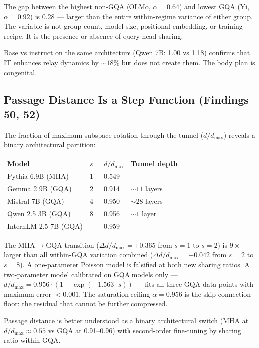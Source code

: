 \documentclass[12pt]{article}
\begin{document}
The gap between the highest non-GQA (OLMo, $\alpha = 0.64$) and lowest GQA (Yi, $\alpha = 0.92$) is 0.28 --- larger than the entire within-regime variance of either group. The variable is not group count, model size, positional embedding, or training recipe. It is the presence or absence of query-head sharing.

Base vs instruct on the same architecture (Qwen 7B: 1.00 vs 1.18) confirms that IT enhances relay dynamics by ${\sim}18\%$ but does not create them. The body plan is congenital.

\subsection{Passage Distance Is a Step Function (Findings 50, 52)}

The fraction of maximum subspace rotation through the tunnel ($d/d_{\max}$) reveals a binary architectural partition:

\begin{table}[h]
\centering
\begin{tabular}{llll}
\toprule
\textbf{Model} & \textbf{$s$} & $d/d_{\max}$ & \textbf{Tunnel depth} \\
\midrule
Pythia 6.9B (MHA) & 1 & 0.549 & --- \\
Gemma 2 9B (GQA) & 2 & 0.914 & ${\sim}11$ layers \\
Mistral 7B (GQA) & 4 & 0.950 & ${\sim}28$ layers \\
Qwen 2.5 3B (GQA) & 8 & 0.956 & ${\sim}1$ layer \\
InternLM 2.5 7B (GQA) & --- & 0.959 & --- \\
\bottomrule
\end{tabular}
\end{table}

The MHA$\to$GQA transition ($\Delta d/d_{\max} = +0.365$ from $s = 1$ to $s = 2$) is $9\times$ larger than all within-GQA variation combined ($\Delta d/d_{\max} = +0.042$ from $s = 2$ to $s = 8$). A one-parameter Poisson model is falsified at both new sharing ratios. A two-parameter model calibrated on GQA models only --- $d/d_{\max} = 0.956 \cdot (1 - \exp(-1.563 \cdot s))$ --- fits all three GQA data points with maximum error $< 0.001$. The saturation ceiling $\alpha = 0.956$ is the skip-connection floor: the residual that cannot be further compressed.

Passage distance is better understood as a binary architectural switch (MHA at $d/d_{\max} \approx 0.55$ vs GQA at 0.91--0.96) with second-order fine-tuning by sharing ratio within GQA.
\end{document}
